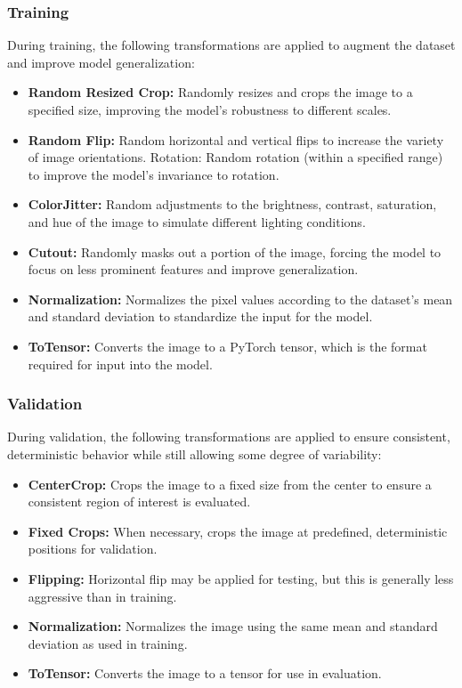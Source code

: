 \documentclass{article}
\begin{document}
\subsubsection{Training}

During training, the following transformations are applied to augment the dataset and improve model
generalization:

\begin{itemize}

\item \textbf{Random Resized Crop:} Randomly resizes and crops the image to a specified size, improving the
model's robustness to different scales.
\item \textbf{Random Flip:} Random horizontal and vertical flips to increase the variety of image orientations.
Rotation: Random rotation (within a specified range) to improve the model's invariance to rotation.
\item \textbf{ColorJitter:} Random adjustments to the brightness, contrast, saturation, and hue of the image to
simulate different lighting conditions.
\item \textbf{Cutout:} Randomly masks out a portion of the image, forcing the model to focus on less prominent
features and improve generalization.
\item \textbf{Normalization:} Normalizes the pixel values according to the dataset's mean and standard deviation to
standardize the input for the model.
\item \textbf{ToTensor:} Converts the image to a PyTorch tensor, which is the format required for input into the
model.

\end{itemize}

\subsubsection{Validation}

During validation, the following transformations are applied to ensure consistent, deterministic behavior while
still allowing some degree of variability:

\begin{itemize}

\item \textbf{CenterCrop:} Crops the image to a fixed size from the center to ensure a consistent region of interest is
evaluated.
\item \textbf{Fixed Crops:} When necessary, crops the image at predefined, deterministic positions for validation.
\item \textbf{Flipping:} Horizontal flip may be applied for testing, but this is generally less aggressive than in
training.
\item \textbf{Normalization:} Normalizes the image using the same mean and standard deviation as used in training.
\item \textbf{ToTensor:} Converts the image to a tensor for use in evaluation.

\end{itemize}
\end{document}
